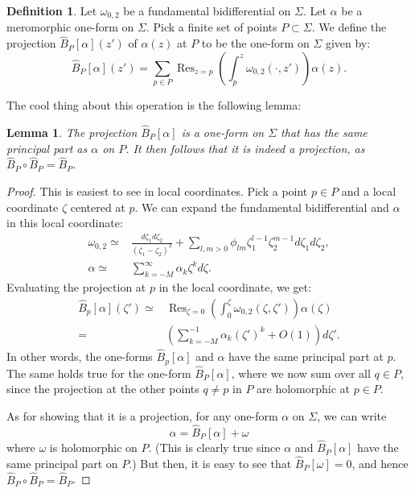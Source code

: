 \documentclass[reqno,oneside,11pt]{amsart}
\theoremstyle{plain}
\newtheorem{lemma}[theorem]{Lemma}
\theoremstyle{definition}
\newtheorem{definition}[theorem]{Definition}
\theoremstyle{remark}
\numberwithin{equation}{section}
\DeclareMathOperator*{\Res}{Res}
\begin{document}
\begin{definition}\label{d:proj}
Let $\omega_{0,2}$ be a fundamental bidifferential on $\Sigma$.  Let $\alpha$ be a meromorphic one-form on $\Sigma$. Pick a finite set of points $P \subset \Sigma$. We define the projection $\hat{B}_P[\alpha](z')$ of $\alpha(z)$ at $P$ to be the one-form on $\Sigma$ given by:
\begin{equation}
\hat{B}_P[\alpha](z') = \sum_{p \in P} \Res_{z=p} \left( \int_p^z \omega_{0,2}(\cdot, z') \right) \alpha(z).
\end{equation}
\end{definition}

The cool thing about this operation is the following lemma:

\begin{lemma}
The projection $\hat{B}_P[\alpha]$ is a one-form on $\Sigma$ that has the same principal part as $\alpha$ on $P$. It then follows that it is indeed a projection, as $\hat{B}_P \circ \hat{B}_P = \hat{B}_P$.
\end{lemma}

\begin{proof}
This is easiest to see in local coordinates. Pick a point $p \in P$ and a local coordinate $\zeta$ centered at $p$. We can expand the fundamental bidifferential and $\alpha$ in this local coordinate:
\begin{align}
\omega_{0,2}\simeq& \frac{d \zeta_1 d \zeta_2}{(\zeta_1-\zeta_2)^2} + \sum_{l,m> 0} \phi_{lm}  \zeta_1^{l-1} \zeta_2^{m-1} d \zeta_1 d \zeta_2,\\
\alpha \simeq& \sum_{k=-M}^\infty \alpha_k \zeta^{k} d \zeta.
\end{align}
Evaluating the projection at  $p$ in the local coordinate, we get:
\begin{align}
\hat{B}_p[\alpha](\zeta') \simeq& \Res_{\zeta=0} \left( \int^\zeta_0 \omega_{0,2}(\zeta,\zeta') \right) \alpha(\zeta) \\
=& \left( \sum_{k=-M}^{-1} \alpha_k (\zeta')^k  + O(1) \right) d \zeta'.
\end{align}
In other words, the one-forms $\hat{B}_p[\alpha]$ and $\alpha$ have the same principal part at $p$. The same holds true for the one-form $\hat{B}_P[\alpha]$, where we now sum over all $q \in P$, since the projection at the other points $q \neq p$ in $P$ are holomorphic at $p \in P$.

As for showing that it is a projection, for any one-form $\alpha$ on $\Sigma$, we can write
\begin{equation}
\alpha = \hat{B}_P[\alpha] + \omega
\end{equation}
where $\omega$ is holomorphic on $P$. (This is clearly true since $\alpha$ and $\hat{B}_P[\alpha]$ have the same principal part on $P$.) But then, it is easy to see that $\hat{B}_P[\omega] = 0$, and hence $\hat{B}_P \circ \hat{B}_P = \hat{B}_P$.
\end{proof}
\end{document}
